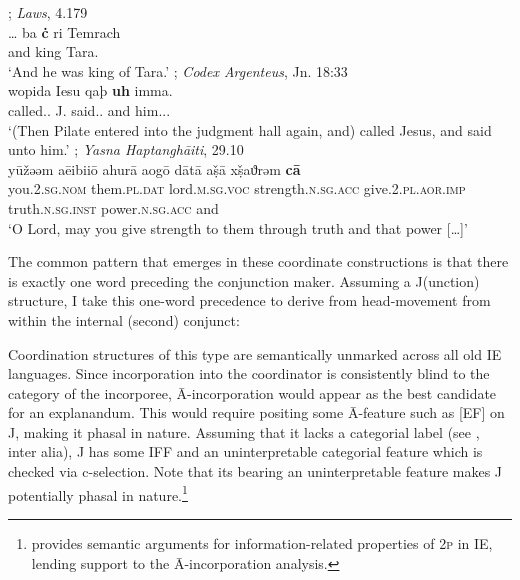 \documentclass[output=paper]{langsci/langscibook}
\begin{document}
\begin{exe}
    \ex {}; \emph{Laws}, 4.179 \parencite{thurneysen:2003dq}\\
    \gll \ldots{} ba  \textbf{{\.{c}}}  ri Temrach \\
    {} \Cop{} and king Tara.\Gen{} \\
	\trans `And he was king of Tara.'\label{oir}
    \ex {}; \emph{Codex Argenteus}, Jn. 18:33\\
    \gll wopida Iesu qa{þ} \textbf{{uh}} imma. \\
	called.\Prt.\Tsg{} J.\Acc{} said.\Prt.\Tsg{} and him.\M.\Dat.\Sg{} \\
    \trans `(Then Pilate entered into the judgment hall again, and) called Jesus, and said unto him.'\label{got}
    \ex {}; \emph{Yasna Haptanghāiti}, 29.10\\
    \gll yūžəəm aēibiiō ahur{ā}  aog{ō} d{ā}t{ā} a{\d{š}}{ā} x{\d{š}}aϑrəm \textbf{{c{ā}}} \\
    you.\textsc{2.sg.nom} them.\textsc{pl.dat} lord.\textsc{m.sg.voc} strength.\textsc{n.sg.acc} give.\textsc{2.pl.aor.imp} truth.\textsc{n.sg.inst} power.\textsc{n.sg.acc} and \\
    \trans	`O Lord, may you give strength to them through truth and that power [\ldots]' \\
\label{avs}
\end{exe}

The common pattern that emerges in these coordinate
constructions is that
there is exactly one word preceding the conjunction maker. Assuming a
J(unc\-tion) structure, I take this one-word precedence to derive from
head-movement from within the internal (second) conjunct:

\begin{exe}
\ex
\end{exe}

Coordination structures of this type are semantically unmarked across all old
IE languages. Since incorporation into the coordinator is consistently blind to
the category of the incorporee, Ā-incorporation would appear as the best
candidate for an explanandum. This would require positing some Ā-feature such
as [\gls{EF}]  on J, making it phasal in nature.
Assuming that it lacks a categorial label (see \citealt{Chomsky2013},
inter alia), J has some \gls{IFF} and an
uninterpretable categorial feature  which is checked via c-selection. Note that
its bearing an uninterpretable feature makes  J
potentially phasal in nature.\footnote{\citet{Mitrovic:2014phd} provides
semantic arguments for information-related properties of \textsc{2p} in IE,
lending support to the Ā-incorporation analysis.}
\end{document}
